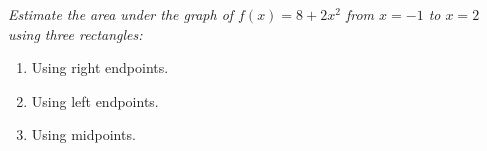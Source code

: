 \documentclass[12pt]{article}
\begin{document}
\bigskip

{ \em Estimate the area under the graph of $f(x)=8+2x^2$ from $x=-1$ to $x=2$ using three rectangles:}
\begin{enumerate}
\item Using right endpoints.

\vspace{4cm}
\begin{flushright}
\end{flushright}
\item Using left endpoints.
\vspace{4cm}
\begin{flushright}
\end{flushright}
\item Using midpoints.
\vspace{4cm}
\begin{flushright}
\end{flushright}
\end{enumerate}
\end{document}
